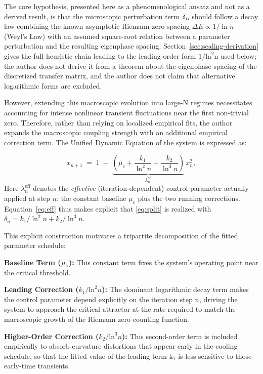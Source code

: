 \documentclass[mca,article,submit,oneauthor,pdftex]{Definitions/mdpi}
\begin{document}
The core hypothesis, presented here as a phenomenological ansatz and not
as a derived result, is that the microscopic
perturbation term \(\text{\ensuremath{\delta}}_{\text{n}}\) should follow a decay law
combining the known asymptotic Riemann-zero spacing
\(\Delta E\propto 1/\ln n\) (Weyl's Law) with an assumed square-root
relation between a parameter perturbation and the resulting eigenphase
spacing. Section~\ref{sec:scaling-derivation} gives the full heuristic
chain leading to the leading-order form
\(\text{1/}\text{ln}^{\text{2}}\text{n}\) used below; the author does not derive it
from a theorem about the eigenphase spacing of the discretized transfer
matrix, and the author does not claim that alternative logarithmic forms are
excluded.

However, extending this macroscopic evolution into large-N regimes
necessitates accounting for intense nonlinear transient fluctuations
near the first non-trivial zero. Therefore, rather than relying on localized
empirical fits, the author expands the macroscopic coupling strength with an
additional empirical correction term. The Unified Dynamic Equation of
the system is expressed as:

\begin{equation}\label{eq:eff}
x_{n+1} \;=\; 1 \;-\; \underbrace{\left( \mu_c + \frac{k_1}{\ln^2 n} + \frac{k_2}{\ln^3 n} \right)}_{\displaystyle \lambda_n^{\mathrm{eff}}}\, x_n^{2},
\end{equation}
 Here $\lambda_n^{\mathrm{eff}}$ denotes the \emph{effective} (iteration-dependent) control parameter actually applied at step $n$: the constant baseline $\mu_c$ plus the two running corrections. Equation~\eqref{eq:eff} thus makes explicit that \eqref{eq:split} is realized with $\delta_n = k_1/\ln^2 n + k_2/\ln^3 n$.

This explicit construction motivates a tripartite decomposition of the
fitted parameter schedule:

\textbf{Baseline Term (}\(\text{\ensuremath{\mu}}_{{c}}\)\textbf{):} This
constant term fixes the system's operating point near the critical
threshold.

\textbf{Leading Correction
(}\({k}_{\text{1}}\text{/}\text{ln}^{\text{2}}{n}\)\textbf{):}
The dominant logarithmic decay term makes the control parameter depend
explicitly on the iteration step \({n}\), driving the system to
approach the critical attractor at the rate required to match the
macroscopic growth of the Riemann zero counting function.

\textbf{Higher-Order Correction
(}\({k}_{\text{2}}\text{/}\text{ln}^{\text{3}}{n}\)\textbf{):}
This second-order term is included empirically to absorb curvature
distortions that appear early in the cooling schedule, so that the
fitted value of the leading term \(\text{k}_{\text{1}}\) is less
sensitive to those early-time transients.
\end{document}
